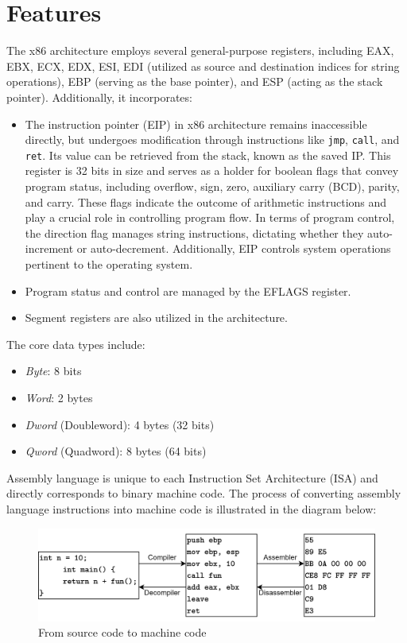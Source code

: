 \section{Features}

The x86 architecture employs several general-purpose registers, including EAX, EBX, ECX, EDX, ESI, EDI (utilized as source and destination indices for string operations), EBP (serving as the base pointer), and ESP (acting as the stack pointer). 
Additionally, it incorporates:
\begin{itemize}
    \item The instruction pointer (EIP) in x86 architecture remains inaccessible directly, but undergoes modification through instructions like \texttt{jmp}, \texttt{call}, and \texttt{ret}. 
        Its value can be retrieved from the stack, known as the saved IP. 
        This register is 32 bits in size and serves as a holder for boolean flags that convey program status, including overflow, sign, zero, auxiliary carry (BCD), parity, and carry. 
        These flags indicate the outcome of arithmetic instructions and play a crucial role in controlling program flow.
        In terms of program control, the direction flag manages string instructions, dictating whether they auto-increment or auto-decrement. 
        Additionally, EIP controls system operations pertinent to the operating system.
    \item Program status and control are managed by the EFLAGS register.
    \item Segment registers are also utilized in the architecture.
\end{itemize}
The core data types include:
\begin{itemize}
    \item \textit{Byte}: 8 bits
    \item \textit{Word}: 2 bytes
    \item \textit{Dword} (Doubleword): 4 bytes (32 bits)
    \item \textit{Qword} (Quadword): 8 bytes (64 bits)
\end{itemize}

Assembly language is unique to each Instruction Set Architecture (ISA) and directly corresponds to binary machine code. 
The process of converting assembly language instructions into machine code is illustrated in the diagram below:
\begin{figure}[H]
    \centering
    \includegraphics[width=0.75\linewidth]{images/assembler.png}
    \caption{From source code to machine code}
\end{figure}